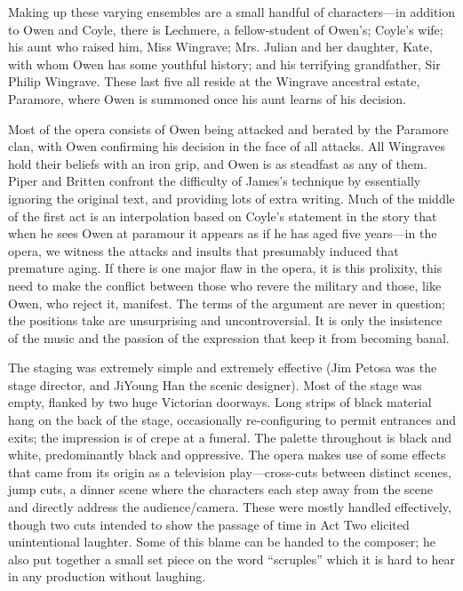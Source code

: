 Making up these varying ensembles are a small handful of characters—in addition to Owen and Coyle, there is Lechmere, a fellow-student of Owen’s; Coyle’s wife; his aunt who raised him, Miss Wingrave; Mrs. Julian and her daughter, Kate, with whom Owen has some youthful history; and his terrifying grandfather, Sir Philip Wingrave. These last five all reside at the Wingrave ancestral estate, Paramore, where Owen is summoned once his aunt learns of his decision.

Most of the opera consists of Owen being attacked and berated by the Paramore clan, with Owen confirming his decision in the face of all attacks. All Wingraves hold their beliefs with an iron grip, and Owen is as steadfast as any of them. Piper and Britten confront the difficulty of James’s technique by essentially ignoring the original text, and providing lots of extra writing. Much of the middle of the first act is an interpolation based on Coyle’s statement in the story that when he sees Owen at paramour it appears as if he has aged five years—in the opera, we witness the attacks and insults that presumably induced that premature aging. If there is one major flaw in the opera, it is this prolixity, this need to make the conflict between those who revere the military and those, like Owen, who reject it, manifest. The terms of the argument are never in question; the positions take are unsurprising and uncontroversial. It is only the insistence of the music and the passion of the expression that keep it from becoming banal.

The staging was extremely simple and extremely effective (Jim Petosa was the stage director, and JiYoung Han the scenic designer). Most of the stage was empty, flanked by two huge Victorian doorways. Long strips of black material hang on the back of the stage, occasionally re-configuring to permit entrances and exits; the impression is of crepe at a funeral. The palette throughout is black and white, predominantly black and oppressive. The opera makes use of some effects that came from its origin as a television play—cross-cuts between distinct scenes, jump cuts, a dinner scene where the characters each step away from the scene and directly address the audience/camera. These were mostly handled effectively, though two cuts intended to show the passage of time in Act Two elicited unintentional laughter. Some of this blame can be handed to the composer; he also put together a small set piece on the word “scruples” which it is hard to hear in any production without laughing.


